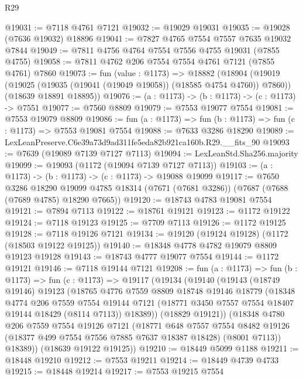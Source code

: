 \begin{lexlean}{R29}
\begin{coremodule}
@19031 := @7118 @4761 @7121
@19032 := @19029 @19031
@19035 := @19028 (@7636 @19032) @18896
@19041 := @7827 @4765 @7554 @7557 @7635 @19032 @7844
@19049 := @7811 @4756 @4764 @7554 @7556 @4755 @19031 (@7855 @4755)
@19058 := @7811 @4762 @206 @7554 @7554 @4761 @7121 (@7855 @4761) @7860
@19073 := fun (value : @1173) =>
  @18882
    (@18904
      (@19019 (@19025 (@19035 (@19041 (@19049 @19058)) (@18585 @4754 @4760)) @7860))
      (@18639 @18891 @18895))
@19076 := (a : @1173) -> (b : @1173) -> (c : @1173) -> @7551
@19077 := @7560 @8809
@19079 := @7553 @19077 @7554
@19081 := @7553 @19079 @8809
@19086 := fun (a : @1173) => fun (b : @1173) => fun (c : @1173) => @7553 @19081 @7554
@19088 := @7633 @3286 @18290
@19089 := LexLeanPreserve.C6e39a73d9ad311fe5eda82b921ca160b.R29.__fits_90
@19093 := @7639 (@19089 @7139 @7127 @7113)
@19094 := LexLeanStd.Sha256.majority
@19099 := @19093 (@1172 (@19094 @7139 @7127 @7113))
@19103 := (a : @1173) -> (b : @1173) -> (c : @1173) -> @19088 @19099
@19117 := @7650
    @3286
    @18290
    @19099
    @4785
    @18314
    (@7671 (@7681 @3286))
    (@7687 (@7688 (@7689 @4785) @18290 @7665))
@19120 := @18743 @4783 @19081 @7554
@19121 := @7894 @7113
@19122 := @18761 @19121
@19123 := @1172 @19122
@19124 := @7118 @19123
@19125 := @7709 @7113
@19126 := @1172 @19125
@19128 := @7118 @19126 @7121
@19134 := @19120 (@19124 @19128) (@1172 (@18503 @19122 @19125))
@19140 := @18348 @4778 @4782 @19079 @8809 @19123 @19128
@19143 := @18743 @4777 @19077 @7554
@19144 := @1172 @19121
@19146 := @7118 @19144 @7121
@19208 := fun (a : @1173) =>
  fun (b : @1173) =>
  fun (c : @1173) =>
  @19117
    (@19134
      (@19140
        (@19143
          (@18749 @19146)
          @19123
          (@18765
            @4776
            @7559
            @8809
            @18748
            @19146
            @18779
            (@18348
              @4774
              @206
              @7559
              @7554
              @19144
              @7121
              (@18771 @3450 @7557 @7554 @18407 @19144 @18429 (@8114 @7113))
              @18389))
          (@18829 @19121))
        (@18348
          @4780
          @206
          @7559
          @7554
          @19126
          @7121
          (@18771
            @648
            @7557
            @7554
            @8482
            @19126
            (@18377 @499 @7554 @7556 @7885 @7637 @18387 @18428)
            (@8001 @7113))
          @18389))
      (@18639 @19122 @19125))
@19210 := @18449 @5099 @1188
@19211 := @18448 @19210
@19212 := @7553 @19211
@19214 := @18449 @4739 @4733
@19215 := @18448 @19214
@19217 := @7553 @19215 @7554

\end{coremodule}
\end{lexlean}
